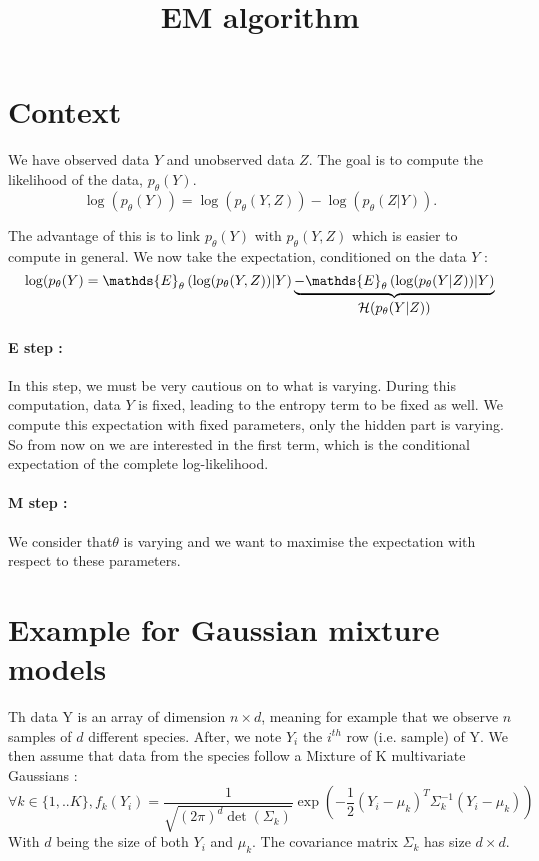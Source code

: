 \documentclass[a4paper,10pt]{article}
\title{EM algorithm}
\author{}
\begin{document}
\maketitle

\begin{abstract}

\end{abstract}

\section{Context}

We have observed data $Y$ and unobserved data $Z$. The goal is to compute the likelihood of the data, $p_\theta (Y)$.
\[ \log(p_\theta (Y)) = \log (p_\theta (Y,Z)) - \log(p_\theta (Z|Y)).\]

The advantage of this is to link $p_\theta(Y)$ with $p_\theta (Y,Z)$ which is easier to compute in general. We now take the expectation,
conditioned on the data $Y$ :
\[ \log(p_\theta (Y) = \mathds{E}_\theta \left(\log(p_\theta (Y,Z))|Y \right) \underbrace{- \mathds{E}_\theta \left(\log(p_\theta (Y|Z))|Y \right)}_{\text{\normalsize{$\mathcal{H}(p_\theta (Y|Z))$}}} \]

\paragraph{E step :}
In this step, we must be very cautious on to what is varying. During this computation, data $Y$ is fixed, leading to the entropy term to be fixed as well.
We compute this expectation with fixed parameters, only the hidden part is varying. So from now on we are interested in the first term, which is the conditional expectation of the complete log-likelihood. \\

\paragraph{M step :}
We consider that$\theta$ is varying and we want to maximise the expectation with respect to these parameters.


\section{Example for Gaussian mixture models}
Th data Y is an array of dimension $n\times d$, meaning for example that we observe $n$ samples of $d$ different species. After, we note
$Y_i$ the $i^{th}$ row (i.e. sample) of Y. We then assume that data from the species follow a Mixture of K multivariate Gaussians :
\[\forall k\in\{1,..K\}, f_k(Y_i) = \frac{1}{\sqrt{(2\pi)^d\det(\Sigma_k)}}\exp\left(-\frac{1}{2}(Y_i - \mu_k)^T\Sigma_k^{-1}(Y_i - \mu_k)\right)\]
With $d$ being the size of both $Y_i$ and $\mu_k$. The covariance matrix $\Sigma_k$ has size $d\times d$.\\
\end{document}
